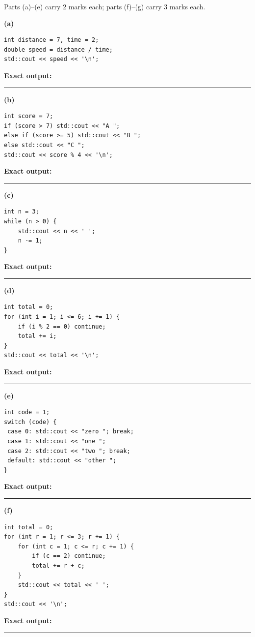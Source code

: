 \documentclass[11pt,a4paper]{article}
\newcommand{\outputbox}[1]{%
  \par\smallskip
  \noindent\textbf{Exact output:}\par
  \vspace{#1}
  \noindent\rule{\linewidth}{0.45pt}%
}
\begin{document}
Parts (a)--(e) carry 2 marks each; parts (f)--(g) carry 3 marks each.

\noindent\begin{minipage}[t]{0.485\linewidth}
\textbf{(a)}
\begin{lstlisting}[style=cpp]
int distance = 7, time = 2;
double speed = distance / time;
std::cout << speed << '\n';
\end{lstlisting}
\outputbox{7mm}
\end{minipage}\hfill
\begin{minipage}[t]{0.485\linewidth}
\textbf{(b)}
\begin{lstlisting}[style=cpp]
int score = 7;
if (score > 7) std::cout << "A ";
else if (score >= 5) std::cout << "B ";
else std::cout << "C ";
std::cout << score % 4 << '\n';
\end{lstlisting}
\outputbox{7mm}
\end{minipage}

\vspace{4pt}
\noindent\begin{minipage}[t]{0.485\linewidth}
\textbf{(c)}
\begin{lstlisting}[style=cpp]
int n = 3;
while (n > 0) {
    std::cout << n << ' ';
    n -= 1;
}
\end{lstlisting}
\outputbox{7mm}
\end{minipage}\hfill
\begin{minipage}[t]{0.485\linewidth}
\textbf{(d)}
\begin{lstlisting}[style=cpp]
int total = 0;
for (int i = 1; i <= 6; i += 1) {
    if (i % 2 == 0) continue;
    total += i;
}
std::cout << total << '\n';
\end{lstlisting}
\outputbox{7mm}
\end{minipage}

\vspace{4pt}
\noindent\begin{minipage}[t]{0.485\linewidth}
\textbf{(e)}
\begin{lstlisting}[style=cpp]
int code = 1;
switch (code) {
 case 0: std::cout << "zero "; break;
 case 1: std::cout << "one ";
 case 2: std::cout << "two "; break;
 default: std::cout << "other ";
}
\end{lstlisting}
\outputbox{7mm}
\end{minipage}\hfill
\begin{minipage}[t]{0.485\linewidth}
\textbf{(f)}
\begin{lstlisting}[style=cpp]
int total = 0;
for (int r = 1; r <= 3; r += 1) {
    for (int c = 1; c <= r; c += 1) {
        if (c == 2) continue;
        total += r + c;
    }
    std::cout << total << ' ';
}
std::cout << '\n';
\end{lstlisting}
\outputbox{7mm}
\end{minipage}
\end{document}
